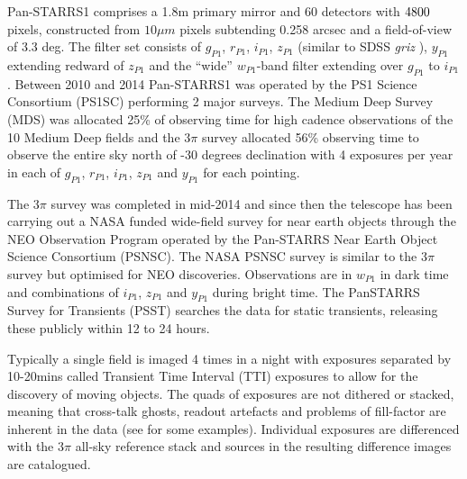 \documentclass[a4paper,fleqn,usenatbib]{mnras}
\begin{document}


Pan-STARRS1 comprises a 1.8m primary mirror \citep{Kaiser10} and 60 detectors with $4800\time 4800$ pixels, constructed from $10\mu m$ pixels subtending 0.258 arcsec \citep{Magnier13} and a field-of-view of 3.3 deg.  The filter set consists of $g_{P1}$, $r_{P1}$, $i_{P1}$, $z_{P1}$ (similar to SDSS \textit{griz} \citep{York00}), $y_{P1}$ extending
redward of $z_{P1}$ and the ``wide'' $w_{P1}$-band filter extending over $g_{P1}$ to $i_{P1}$ \citep{Tonry12b}.  Between 2010 and 2014 Pan-STARRS1 was operated by the PS1 Science Consortium (PS1SC) performing 2 major surveys.  The Medium Deep Survey (MDS) was allocated 25\% of observing time for high cadence observations of the 10 Medium Deep fields and the $3\pi$ survey allocated 56\% observing time to observe the entire sky north of -30 degrees declination with 4 exposures per year in each of $g_{P1}$, $r_{P1}$, $i_{P1}$, $z_{P1}$ and $y_{P1}$ for each pointing.

The $3\pi$ survey was completed in mid-2014 and since then the telescope has been carrying out a NASA funded wide-field survey for near earth objects through the NEO Observation Program operated by the Pan-STARRS Near Earth Object Science Consortium (PSNSC).  The NASA PSNSC survey is similar to the $3\pi$ survey but optimised for NEO discoveries.  Observations are in $w_{P1}$ in dark time and combinations of $i_{P1}$, $z_{P1}$ and $y_{P1}$ during bright time.  The PanSTARRS Survey for Transients (PSST) \citep{Huber15a, Inserra13} searches the data for static transients, releasing these publicly within 12 to 24 hours.

Typically a single field is imaged 4 times in a night with exposures separated by 10-20mins called Transient Time Interval (TTI) exposures to allow for the discovery of moving objects.  The quads of exposures are not dithered or stacked, meaning that cross-talk ghosts, readout artefacts and problems of fill-factor are inherent in the data (see \citet{Denneau13} for some examples).  Individual exposures are differenced with the $3\pi$ all-sky reference stack and sources in the resulting difference images are catalogued.
\end{document}
